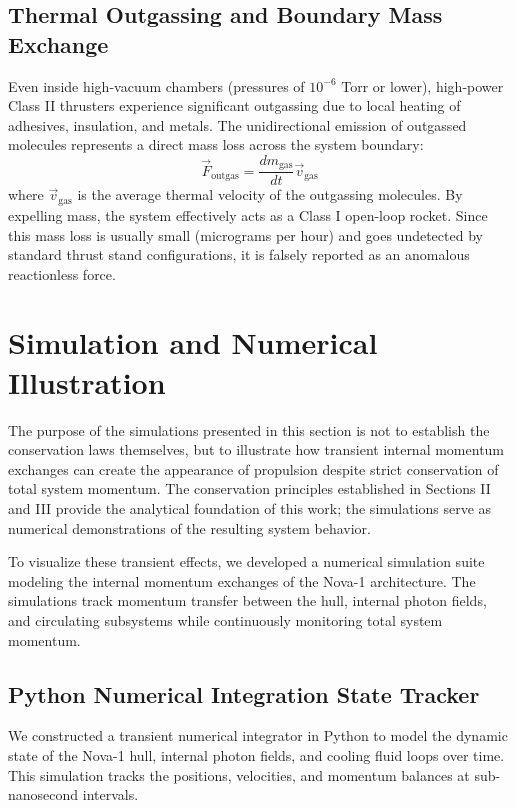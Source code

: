 \documentclass[journal,10pt,twoside]{IEEEtran}
\begin{document}
\subsection{Thermal Outgassing and Boundary Mass Exchange}
Even inside high-vacuum chambers (pressures of $10^{-6}$ Torr or lower), high-power Class II thrusters experience significant outgassing due to local heating of adhesives, insulation, and metals. The unidirectional emission of outgassed molecules represents a direct mass loss across the system boundary:
\begin{equation}
\vec{F}_{\text{outgas}} = \frac{dm_{\text{gas}}}{dt} \vec{v}_{\text{gas}}
\label{eq:outgassing_force}
\end{equation}
where $\vec{v}_{\text{gas}}$ is the average thermal velocity of the outgassing molecules. By expelling mass, the system effectively acts as a Class I open-loop rocket. Since this mass loss is usually small (micrograms per hour) and goes undetected by standard thrust stand configurations, it is falsely reported as an anomalous reactionless force.

\section{Simulation and Numerical Illustration}

The purpose of the simulations presented in this section is not to establish the conservation laws themselves, but to illustrate how transient internal momentum exchanges can create the appearance of propulsion despite strict conservation of total system momentum. The conservation principles established in Sections II and III provide the analytical foundation of this work; the simulations serve as numerical demonstrations of the resulting system behavior.

To visualize these transient effects, we developed a numerical simulation suite modeling the internal momentum exchanges of the Nova-1 architecture. The simulations track momentum transfer between the hull, internal photon fields, and circulating subsystems while continuously monitoring total system momentum.

\subsection{Python Numerical Integration State Tracker}
We constructed a transient numerical integrator in Python to model the dynamic state of the Nova-1 hull, internal photon fields, and cooling fluid loops over time. This simulation tracks the positions, velocities, and momentum balances at sub-nanosecond intervals.
\end{document}

